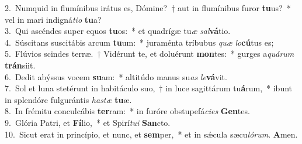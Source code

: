 {2.~}Numquid in flumínibus irátus es, Dómine?~† aut in flumínibus furor \textbf{tu}us?~* vel in mari indigná\textit{ti}\textit{o} \textbf{tu}a?\\
{3.~}Qui ascéndes super equos \textbf{tu}os:~* et quadrígæ tu\textit{æ} \textit{sal}\textbf{vá}tio.\\
{4.~}Súscitans suscitábis arcum \textbf{tu}um:~* juraménta tríbubus \textit{quæ} \textit{lo}\textbf{cú}tus es;\\
{5.~}Flúvios scindes terræ.~† Vidérunt te, et doluérunt \textbf{mon}tes:~* gurges a\textit{quá}\textit{rum} \textbf{trán}siit.\\
{6.~}Dedit abýssus vocem \textbf{su}am:~* altitúdo manus su\textit{as} \textit{le}\textbf{vá}vit.\\
{7.~}Sol et luna stetérunt in habitáculo suo,~† in luce sagittárum tu\textbf{á}rum,~* ibunt in splendóre fulgurántis \textit{ha}\textit{stæ} \textbf{tu}æ.\\
{8.~}In frémitu conculcábis \textbf{ter}ram:~* in furóre obstupefá\textit{ci}\textit{es} \textbf{Gen}tes.\\
{9.~}Glória Patri, et \textbf{Fí}lio,~* et Spirí\textit{tu}\textit{i} \textbf{San}cto.\\
{10.~}Sicut erat in princípio, et nunc, et \textbf{sem}per,~* et in sǽcula sæcu\textit{ló}\textit{rum}. \textbf{A}men.\\
